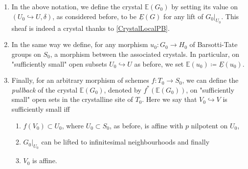 \begin{defn}[]\label{MessingCrystalDefinition}\leavevmode\vspace{-\baselineskip}
\begin{enumerate}
\item In the above notation, we define the crystal $\mathbb{E}(G_0)$
	by setting its value on $\left(U_0 \hookrightarrow U, \delta\right)$, as considered
	before, to be $\underline{E}(G)$ for any lift of $\left.G_0\right|_{U_0}$.
	This sheaf is indeed a crystal thanks to \cref{CrystalLocalPB}.

\item In the same way we define, for any morphism $u_0\colon G_0 \to H_0$ of 
	Barsotti-Tate groups on $S_0$, a morphism 
	between the associated crystals.
	In particular, on "sufficiently
	small" open subsets $U_0 \hookrightarrow U$ as before,
	we set $\mathbb{E}(u_0) \coloneqq \underline{E}(u_0)$.

\item Finally, for an arbitrary morphism of schemes $f\colon T_0 \to S_0$,
	we can define the \emph{pullback} of the crystal $\mathbb{E}(G_0)$, denoted
	by $f^* \left( \mathbb{E}(G_0) \right)$, on "sufficiently small" open
	sets in the crystalline site of $T_0$.
	Here we say that $V_0 \hookrightarrow V$ is sufficiently small iff
\begin{enumerate}
	\item $f(V_0) \subset U_0$, where \(U_0 \subset S_0\),
		as before, is affine with \(p\) nilpotent on \(U_0\),

	\item $\left.G_0\right|_{U_0}$ can be lifted to infinitesimal
		neighbourhoods and finally

	\item $V_0$ is affine.
\end{enumerate}
\end{enumerate}
\end{defn}


